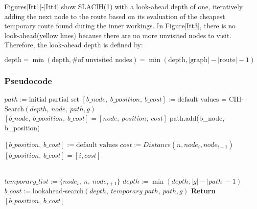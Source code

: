 Figures\ref{Itt1}-\ref{Itt4} show SLACIH(1) with a look-ahead depth of one, iteratively adding the next node to the route based on its evaluation of the cheapest temporary route found during the inner workings. In Figure\ref{Itt3}, there is no look-ahead(yellow lines) because there are no more unvisited nodes to visit. Therefore, the look-ahead depth is defined by:

\begin{equation}
    \text{depth} = \min(\text{depth}, \text{\# of unvisited nodes}) = \min(\text{depth}, |\text{graph}|-|\text{route}|-1)
\end{equation}


\pagebreak
\subsubsection{Pseudocode}

\begin{algorithm}[H]
\caption{SLACIH$(depth : \text{integer}, g: \text{Graph})$}
\begin{algorithmic}[1]
\State $path := \text{initial partial set}$ 
 
    \State $[b\_node,\ b\_position,\ b\_cost] := \text{default values}$
     
         = CIH-Search$(depth,\ node,\ path, g)$
         
            \State $[b\_node,\ b\_position,\ b\_cost] = [node,\ position,\ cost]$
        \EndIf
    \EndFor
    \State path.add(b\_node, b\_position)
\EndWhile
\end{algorithmic}
\end{algorithm}

\begin{algorithm}[H]
\caption{CIH-Search$(\text{depth} : \text{integer}, n : \text{Node}, \text{path} : \text{route},g : \text{graph})$}
\begin{algorithmic}[1]
\State $[b\_position,\ b\_cost] := \text{default values}$
 
    \State $cost := Distance(n, node_i, node_{i+1})$
        \State$[b\_position,\ b\_cost] = [i,cost]$
    \EndIf
\EndFor


\State \\$temporary\_list := \{node_i,\ n,\ node_{i+1}\}$ 
\State $depth := \min(depth, |g|-|path|-1)$\\

\State $b\_cost := $lookahead-search$(depth,\ temporary\_path,\ path,g)$
\State \textbf{Return} $[b\_position,\ b\_cost]$
\end{algorithmic}
\end{algorithm}

